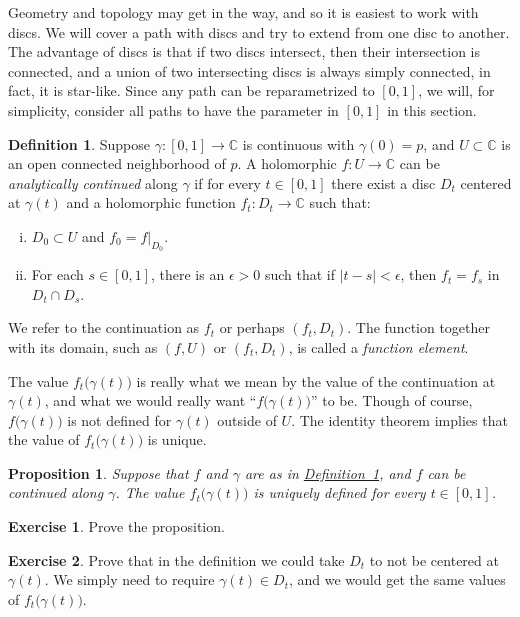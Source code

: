 \documentclass[12pt,openany]{book}
\newcommand{\sabs}[1]{\lvert {#1} \rvert}
\newcommand{\C}{{\mathbb{C}}}
\newcommand{\myindex}[1]{#1\index{#1}}
\newcommand{\myquote}[1]{``#1''}
\theoremstyle{plain}
\newtheorem{prop}[thm]{Proposition}
\theoremstyle{remark}
\theoremstyle{definition}
\newtheorem{defn}[thm]{Definition}
\newenvironment{exbox}{%
    \def\FrameCommand{\vrule width 1pt \relax\hspace{10pt}}%
    \MakeFramed{\advance\hsize-\width\FrameRestore}%
}{%
    \endMakeFramed
}
\theoremstyle{exercise}
\newtheorem{exercise}{Exercise}[section]
\theoremstyle{example}
\newcommand{\defnref}[1]{\hyperref[#1]{Definition~\ref*{#1}}}
\begin{document}
Geometry and topology may get in the way, and so it is easiest
to work with discs.  We will cover a path with discs and try to
extend from one disc to another.  The advantage of discs is that if two
discs intersect, then their intersection is connected, and a union of two
intersecting discs is always simply connected, in fact, it is star-like.
Since any path can be reparametrized to $[0,1]$, we will, for simplicity,
consider all paths to have the parameter in $[0,1]$ in this section.

\begin{defn} \label{defn:analcont}
Suppose $\gamma \colon [0,1] \to \C$ is continuous with $\gamma(0) = p$,
and $U \subset \C$ is an open connected neighborhood of $p$.
A holomorphic 
$f \colon U \to \C$
can be
\emph{analytically continued}
along $\gamma$
if for every $t \in [0,1]$ there exist
a disc $D_t$ centered at $\gamma(t)$ and a holomorphic function
$f_t \colon D_t \to \C$ such that:
\begin{enumerate}[(i)]
\item
$D_0 \subset U$ and $f_0 = f|_{D_0}$.
\item
For each $s \in [0,1]$, there is an
$\epsilon > 0$ such that if $\sabs{t-s} < \epsilon$, then
$f_t = f_s$ in $D_t \cap D_s$.
\end{enumerate}
We refer to the continuation as $f_t$ or perhaps $(f_t,D_t)$.
The function together with its domain, such as $(f,U)$ or $(f_t,D_t)$,
is called a \emph{\myindex{function element}}.
\end{defn}

The value
$f_t\bigl(\gamma(t)\bigr)$ is really what we mean by the value of
the continuation at $\gamma(t)$, and what we would really want
\myquote{$f\bigl(\gamma(t)\bigr)$} to be.
Though of course, $f\bigl(\gamma(t)\bigr)$ is not defined for $\gamma(t)$ outside of
$U$.
The identity theorem implies that the value of
$f_t\bigl(\gamma(t)\bigr)$ is unique.

\begin{prop}
Suppose that $f$ and $\gamma$ are as in \defnref{defn:analcont},
and
$f$ can be continued along $\gamma$.
The value $f_t\bigl(\gamma(t)\bigr)$ is uniquely
defined for every $t \in [0,1]$.
\end{prop}

\begin{exbox}
\begin{exercise}
Prove the proposition.
\end{exercise}

\begin{exercise}
Prove that in the definition we could take $D_t$ to not be centered at
$\gamma(t)$.  We simply need to require $\gamma(t) \in D_t$, and we would
get the same values of $f_t\bigl(\gamma(t)\bigr)$.
\end{exercise}
\end{exbox}
\end{document}
